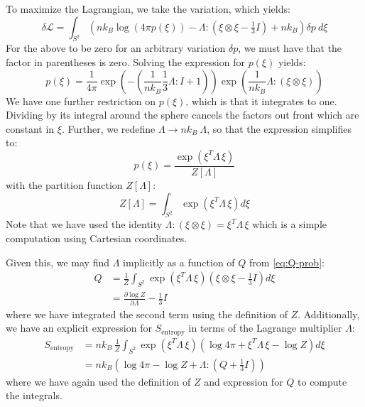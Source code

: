 \documentclass[reqno]{article}
\begin{document}
  To maximize the Lagrangian, we take the variation, which yields:
  \begin{equation}
    \delta \mathcal{L}
    =
    \int_{S^2} \left(
      n k_B \log \left( 4 \pi p(\xi) \right)
      - \Lambda : (\xi \otimes \xi - \tfrac13 I)
      + n k_B
    \right) \delta p \: d \xi
  \end{equation}
  For the above to be zero for an arbitrary variation $\delta p$, we must have
  that the factor in parentheses is zero.
  Solving the expression for $p(\xi)$ yields:
  \begin{equation}
    p(\xi)
    =
    \frac{1}{4\pi}
    \exp \left(
      -\left(\frac{1}{n k_B} \frac13 \Lambda : I + 1\right)
    \right)
    \exp \left(
      \frac{1}{n k_B} \Lambda : (\xi \otimes \xi)
    \right)
  \end{equation}
  We have one further restriction on $p(\xi)$, which is that it integrates to
  one.
  Dividing by its integral around the sphere cancels the factors out front which
  are constant in $\xi$.
  Further, we redefine $\Lambda \to n k_B \: \Lambda$, so that the expression
  simplifies to:
  \begin{equation}
    p(\xi)
    =
    \frac{\exp \left( \xi^T \Lambda \, \xi \right)}{Z[\Lambda]}
  \end{equation}
  with the partition function $Z[\Lambda]$:
  \begin{equation}
    Z[\Lambda] = \int_{S^2} \exp \left( \xi^T \Lambda \, \xi \right) d\xi
  \end{equation}
  Note that we have used the identity $\Lambda : (\xi \otimes \xi) = \xi^T
  \Lambda \, \xi$ which is a simple computation using Cartesian coordinates.

  Given this, we may find $\Lambda$ implicitly as a function of $Q$ from
  \eqref{eq:Q-prob}:
  \begin{equation} \label{eq:Q-Lambda}
    \begin{split}
      Q
      &=
      \frac{1}{Z} \int_{S^2} \exp(\xi^T \Lambda \, \xi) \left( \xi \otimes \xi - \tfrac13 I \right) d\xi \\
      &=
      \frac{\partial \log Z}{\partial \Lambda} - \frac13 I
    \end{split}
  \end{equation}
  where we have integrated the second term using the definition of $Z$.
  Additionally, we have an explicit expression for $S_\text{entropy}$ in terms
  of the Lagrange multiplier $\Lambda$:
  \begin{equation}
    \begin{split}
      S_\text{entropy}
      &=
      n k_B \,
      \frac{1}{Z}
      \int_{S^2}
      \exp(\xi^T \Lambda \, \xi) \left( \log 4 \pi + \xi^T \Lambda \, \xi - \log Z \right) d\xi \\
      &=
      n k_B \left(
        \log 4 \pi - \log Z + \Lambda : \left( Q + \tfrac13 I \right)
      \right)
    \end{split}
  \end{equation}
  where we have again used the definition of $Z$ and expression for $Q$ to
  compute the integrals.
\end{document}
